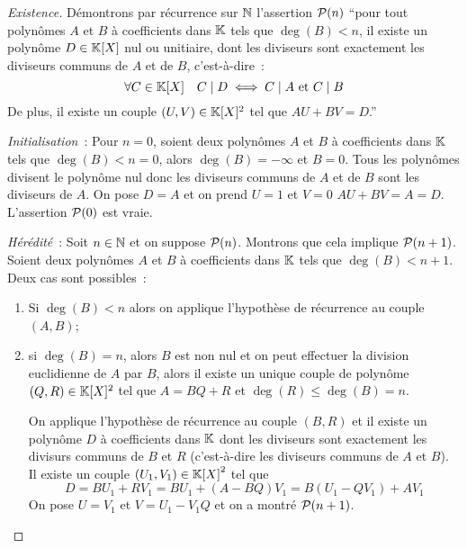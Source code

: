 \begin{proof}[Existence]
  Démontrons par récurrence sur \(\N\) l'assertion \(\P(n)\) ``pour tout 
  polynômes \(A\) et \(B\) à coefficients dans \(\K\) tels que \(\deg(B)<n\), il 
  existe un polynôme \(D \in \K[X]\)  nul ou unitiaire, dont les diviseurs sont 
  exactement les diviseurs communs de \(A\) et de \(B\), c'est-à-dire~:
  \begin{equation}
    \forall C \in \K[X] \quad C\mid{}D \iff C\mid{}A \text{~et~} C\mid{}B
  \end{equation}
  De plus, il existe un couple \((U,V) \in \K[X]^2\) tel que \(AU+BV = D\).''

  \emph{Initialisation}~: Pour \(n = 0\), soient deux polynômes \(A\) et \(B\) à 
  coefficients dans \(\K\) tels que \(\deg(B)<n = 0\), alors \(\deg(B) = -\infty\) 
  et \(B = 0\). Tous les polynômes divisent le polynôme nul donc les diviseurs 
  communs de \(A\) et de \(B\) sont les diviseurs de \(A\). On pose \(D = A\) et 
  on prend \(U = 1\) et \(V = 0\) \(AU + BV = A = D\). L'assertion \(\P(0)\) est vraie.

  \emph{Hérédité}~: Soit \(n \in \N\) et on suppose \(\P(n)\). Montrons que cela 
  implique \(\P(n+1)\). Soient deux polynômes \(A\) et \(B\) à coefficients dans 
  \(\K\) tels que \(\deg(B)<n+1\). Deux cas sont possibles~:
  \begin{enumerate}
    \item Si \(\deg(B)<n\) alors on applique l'hypothèse de récurrence au 
      couple \((A,B)\);
    \item si \(\deg(B) = n\), alors \(B\) est non nul et on peut effectuer la 
      division euclidienne de \(A\) par \(B\), alors il existe un unique couple 
      de polynôme \((Q,R) \in \K[X]^2\) tel que \(A = BQ+R\) et 
      \(\deg(R)\leqslant\deg(B) = n\).

      On applique l'hypothèse de récurrence au couple \((B,R)\) et il existe un 
      polynôme \(D\) à coefficients dans \(\K\) dont les diviseurs sont 
      exactement les divisurs communs de \(B\) et \(R\) (c'est-à-dire les 
      diviseurs communs de \(A\) et \(B\)). Il existe un couple \((U_1,V_1) \in 
      {\K[X]}^2\) tel que
      \begin{equation}
        D = BU_1+RV_1 = BU_1+(A-BQ)V_1 = B(U_1-QV_1)+AV_1
      \end{equation}
      On pose \(U = V_1\) et \(V = U_1-V_1Q\) et on a montré \(\P(n+1)\).
  \end{enumerate}


\end{proof}
